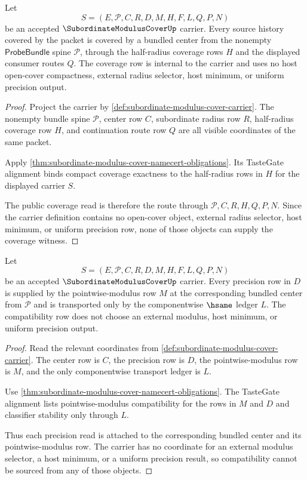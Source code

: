 \begin{theorem}
\label{thm:subordinate-modulus-cover-compact-coverage-exactness}
Let
$$
S=(E,\mathcal{P},C,R,D,M,H,F,L,Q,P,N)
$$
be an accepted $\SubordinateModulusCoverUp$ carrier. Every source history covered by the packet is covered by a bundled center from the nonempty $\mathsf{ProbeBundle}$ spine $\mathcal{P}$, through the half-radius coverage rows $H$ and the displayed consumer routes $Q$. The coverage row is internal to the carrier and uses no host open-cover compactness, external radius selector, host minimum, or uniform precision output.
\end{theorem}
\begin{proof}
Project the carrier by \autoref{def:subordinate-modulus-cover-carrier}. The nonempty bundle spine $\mathcal{P}$, center row $C$, subordinate radius row $R$, half-radius coverage row $H$, and continuation route row $Q$ are all visible coordinates of the same packet.

Apply \autoref{thm:subordinate-modulus-cover-namecert-obligations}. Its TasteGate alignment binds compact coverage exactness to the half-radius rows in $H$ for the displayed carrier $S$.

The public coverage read is therefore the route through $\mathcal{P},C,R,H,Q,P,N$. Since the carrier definition contains no open-cover object, external radius selector, host minimum, or uniform precision row, none of those objects can supply the coverage witness.
\end{proof}

\begin{theorem}
\label{thm:subordinate-modulus-cover-pointwise-compatibility}
Let
$$
S=(E,\mathcal{P},C,R,D,M,H,F,L,Q,P,N)
$$
be an accepted $\SubordinateModulusCoverUp$ carrier. Every precision row in $D$ is supplied by the pointwise-modulus row $M$ at the corresponding bundled center from $\mathcal{P}$ and is transported only by the componentwise $\hsame$ ledger $L$. The compatibility row does not choose an external modulus, host minimum, or uniform precision output.
\end{theorem}
\begin{proof}
Read the relevant coordinates from \autoref{def:subordinate-modulus-cover-carrier}. The center row is $C$, the precision row is $D$, the pointwise-modulus row is $M$, and the only componentwise transport ledger is $L$.

Use \autoref{thm:subordinate-modulus-cover-namecert-obligations}. The TasteGate alignment lists pointwise-modulus compatibility for the rows in $M$ and $D$ and classifier stability only through $L$.

Thus each precision read is attached to the corresponding bundled center and its pointwise-modulus row. The carrier has no coordinate for an external modulus selector, a host minimum, or a uniform precision result, so compatibility cannot be sourced from any of those objects.
\end{proof}

